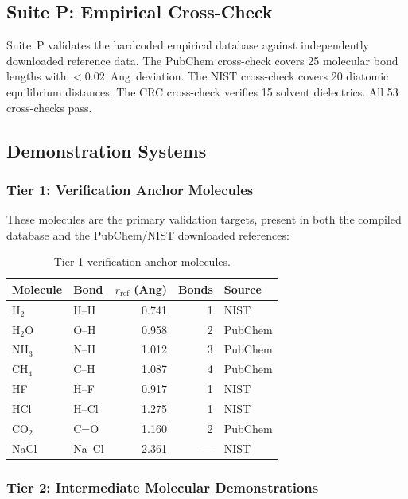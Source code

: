 \documentclass[11pt,twoside]{article}
\def\AA{Ang}%
\begin{document}
\subsection{Suite P: Empirical Cross-Check}

Suite~P validates the hardcoded empirical database against independently downloaded reference data. The PubChem cross-check covers 25 molecular bond lengths with $<0.02$~\AA\ deviation. The NIST cross-check covers 20 diatomic equilibrium distances. The CRC cross-check verifies 15 solvent dielectrics. All 53 cross-checks pass.

\subsection{Demonstration Systems}

\subsubsection{Tier 1: Verification Anchor Molecules}

These molecules are the primary validation targets, present in both the compiled database and the PubChem/NIST downloaded references:

\begin{table}[H]
\centering
\caption{Tier 1 verification anchor molecules.}
\label{tab:tier1}
\begin{tabular}{llrrl}
\toprule
\textbf{Molecule} & \textbf{Bond} & \textbf{$r_{\mathrm{ref}}$ (\AA)} & \textbf{Bonds} & \textbf{Source} \\
\midrule
H$_2$  & H--H & 0.741 & 1 & NIST \\
H$_2$O & O--H & 0.958 & 2 & PubChem \\
NH$_3$ & N--H & 1.012 & 3 & PubChem \\
CH$_4$ & C--H & 1.087 & 4 & PubChem \\
HF     & H--F & 0.917 & 1 & NIST \\
HCl    & H--Cl& 1.275 & 1 & NIST \\
CO$_2$ & C=O  & 1.160 & 2 & PubChem \\
NaCl   & Na--Cl & 2.361 & --- & NIST \\
\bottomrule
\end{tabular}
\end{table}

\subsubsection{Tier 2: Intermediate Molecular Demonstrations}
\end{document}
